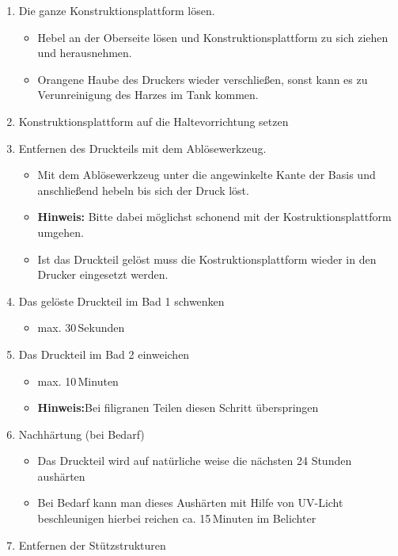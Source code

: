 \documentclass{\basedir/fablab-document}
\begin{document}
	\begin{enumerate}
	\item Die ganze Konstruktionsplattform lösen.
	\begin{itemize}
		\item Hebel an der Oberseite lösen und Konstruktionsplattform zu sich ziehen und herausnehmen.
		\item Orangene Haube des Druckers wieder verschließen, sonst kann es zu Verunreinigung des Harzes im Tank kommen.
	\end{itemize}
	\item Konstruktionsplattform auf die Haltevorrichtung setzen
	\item Entfernen des Druckteils mit dem Ablösewerkzeug.
	\begin{itemize}
		\item Mit dem Ablösewerkzeug unter die angewinkelte Kante der Basis und anschließend hebeln bis sich der Druck löst.
		\item \textbf{Hinweis:} Bitte dabei möglichst schonend mit der Kostruktionsplattform umgehen.
		\item Ist das Druckteil gelöst muss die Kostruktionsplattform wieder in den Drucker eingesetzt werden.
	\end{itemize}
	\item Das gelöste Druckteil im Bad 1 schwenken
	\begin{itemize}
		\item max. 30\,Sekunden
	\end{itemize}
	\item Das Druckteil im Bad 2 einweichen
	\begin{itemize}
		\item max. 10\,Minuten
		\item \textbf{Hinweis:}Bei filigranen Teilen diesen Schritt überspringen
	\end{itemize}
	\item Nachhärtung (bei Bedarf)
		\begin{itemize}
		\item Das Druckteil wird auf natürliche weise die nächsten 24 Stunden aushärten 
		\item Bei Bedarf kann man dieses Aushärten mit Hilfe von UV-Licht beschleunigen hierbei reichen ca. 15\,Minuten im Belichter
	\end{itemize}
	\item Entfernen der Stützstrukturen
	
	\end{enumerate}
	
\end{document}
